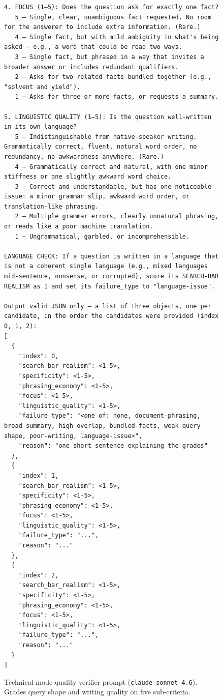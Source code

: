 \begin{figure}[h!]
\begin{minipage}{0.95\textwidth}
\begin{Verbatim}[breaklines=true, breakanywhere=true]
4. FOCUS (1–5): Does the question ask for exactly one fact?
   5 — Single, clear, unambiguous fact requested. No room for the answerer to include extra information. (Rare.)
   4 — Single fact, but with mild ambiguity in what's being asked — e.g., a word that could be read two ways.
   3 — Single fact, but phrased in a way that invites a broader answer or includes redundant qualifiers.
   2 — Asks for two related facts bundled together (e.g., "solvent and yield").
   1 — Asks for three or more facts, or requests a summary.

5. LINGUISTIC QUALITY (1–5): Is the question well-written in its own language?
   5 — Indistinguishable from native-speaker writing. Grammatically correct, fluent, natural word order, no redundancy, no awkwardness anywhere. (Rare.)
   4 — Grammatically correct and natural, with one minor stiffness or one slightly awkward word choice.
   3 — Correct and understandable, but has one noticeable issue: a minor grammar slip, awkward word order, or translation-like phrasing.
   2 — Multiple grammar errors, clearly unnatural phrasing, or reads like a poor machine translation.
   1 — Ungrammatical, garbled, or incomprehensible.

LANGUAGE CHECK: If a question is written in a language that is not a coherent single language (e.g., mixed languages mid-sentence, nonsense, or corrupted), score its SEARCH-BAR REALISM as 1 and set its failure_type to "language-issue".

Output valid JSON only — a list of three objects, one per candidate, in the order the candidates were provided (index 0, 1, 2):
[
  {
    "index": 0,
    "search_bar_realism": <1-5>,
    "specificity": <1-5>,
    "phrasing_economy": <1-5>,
    "focus": <1-5>,
    "linguistic_quality": <1-5>,
    "failure_type": "<one of: none, document-phrasing, broad-summary, high-overlap, bundled-facts, weak-query-shape, poor-writing, language-issue>",
    "reason": "one short sentence explaining the grades"
  },
  {
    "index": 1,
    "search_bar_realism": <1-5>,
    "specificity": <1-5>,
    "phrasing_economy": <1-5>,
    "focus": <1-5>,
    "linguistic_quality": <1-5>,
    "failure_type": "...",
    "reason": "..."
  },
  {
    "index": 2,
    "search_bar_realism": <1-5>,
    "specificity": <1-5>,
    "phrasing_economy": <1-5>,
    "focus": <1-5>,
    "linguistic_quality": <1-5>,
    "failure_type": "...",
    "reason": "..."
  }
]
\end{Verbatim}
\end{minipage}
\caption{Technical-mode quality verifier prompt (\texttt{claude-sonnet-4.6}). Grades query shape and writing quality on five sub-criteria.}
\label{fig:verifier-tech}
\end{figure}

